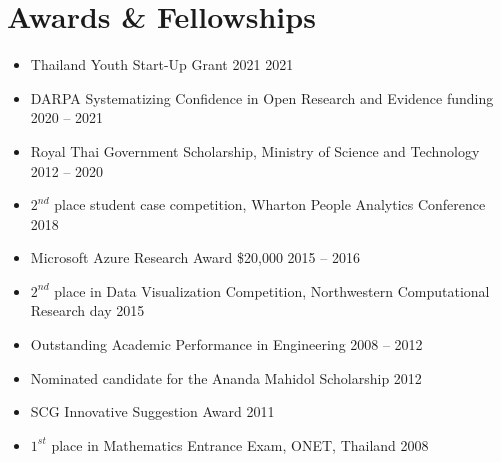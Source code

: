 \section{\sc Awards \& Fellowships}

\begin{itemize}[leftmargin=0cm, label={}]
\itemsep0em

\item Thailand Youth Start-Up Grant 2021 \hfill 2021

\item DARPA Systematizing Confidence in Open Research and Evidence funding \hfill 2020 -- 2021

\item Royal Thai Government Scholarship, Ministry of Science and Technology \hfill 2012 -- 2020

\item $2^{nd}$ place student case competition, Wharton People Analytics Conference \hfill 2018

\item Microsoft Azure Research Award \$20,000 \hfill 2015 -- 2016

\item $2^{nd}$ place in Data Visualization Competition, Northwestern Computational Research day \hfill 2015

\item Outstanding Academic Performance in Engineering	\hfill 2008 -- 2012

\item Nominated candidate for the Ananda Mahidol Scholarship \hfill 2012

\item SCG Innovative Suggestion Award	\hfill 2011

\item $1^{st}$ place in Mathematics Entrance Exam, ONET, Thailand \hfill 2008\\

\end{itemize}
